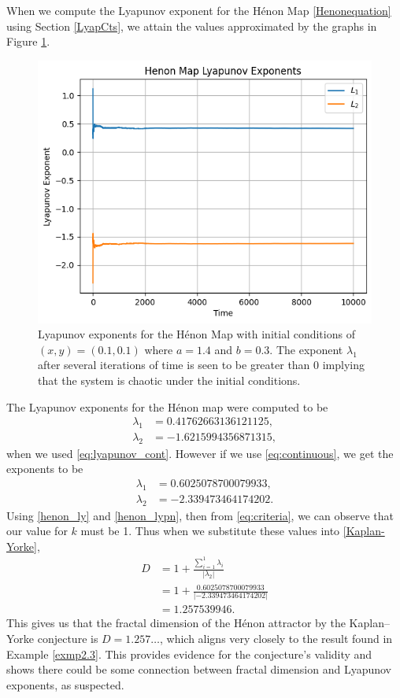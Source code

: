\begin{exmp}
    When we compute the Lyapunov exponent for the Hénon Map \eqref{Henonequation} using Section \ref{LyapCts}, we attain the values approximated by the graphs in Figure \ref{fig:LyaHen}.
    \begin{figure}
        \centering
        \includegraphics[width=0.8\linewidth]{Bifurcation Images/lyapunov_henon.png}
        \caption{Lyapunov exponents for the Hénon Map with initial conditions of $(x,y)=(0.1,0.1)$ where $a=1.4$ and $b=0.3$. The exponent $\lambda_1$ after several iterations of time is seen to be greater than 0 implying that the system is chaotic under the initial conditions.}
        \label{fig:LyaHen}
    \end{figure}
    The Lyapunov exponents for the Hénon map were computed to be 
    \begin{align*}
        \lambda_1 &= 0.41762663136121125, \\
        \lambda_2 &= -1.6215994356871315,
    \end{align*}
     when we used \eqref{eq:lyapunov_cont}. However if we use \eqref{eq:continuous}, we get the exponents to be 
    \begin{align}
        \lambda_1 &= 0.6025078700079933, \label{henon_ly} \\
        \lambda_2 &= -2.339473464174202. \label{henon_lypn}
    \end{align}
    Using \eqref{henon_ly} and \eqref{henon_lypn}, then from \eqref{eq:criteria}, we can observe that our value for $k$ must be 1. Thus when we substitute these values into \eqref{Kaplan-Yorke},
    \begin{align*}
        D &= 1 + \frac{\sum_{i=1}^1 \lambda_i}{|\lambda_{2}|} \\
        &=1 + \frac{0.6025078700079933}{|-2.339473464174202|} \\
        &=1.257539946.
    \end{align*}
    This gives us that the fractal dimension of the Hénon attractor by the Kaplan–Yorke conjecture is $D=1.257\dots$, which aligns very closely to the result found in Example \ref{exmp2.3}. This provides evidence for the conjecture's validity and shows there could be some connection between fractal dimension and Lyapunov exponents, as suspected.


\end{exmp}
